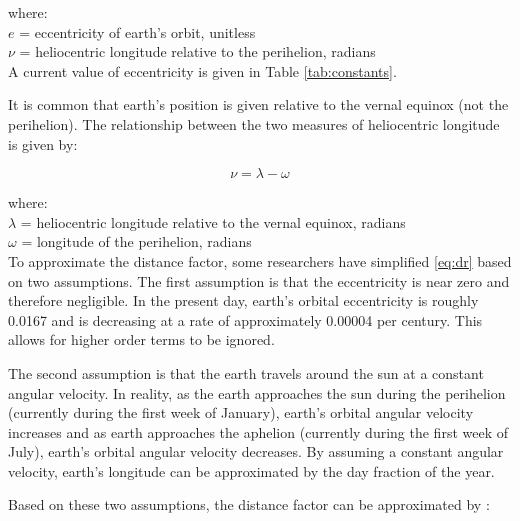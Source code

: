 \noindent where: \\
\indent $e$ = eccentricity of earth's orbit, unitless \\
\indent $\nu$ = heliocentric longitude relative to the perihelion, radians \\

\noindent A current value of eccentricity is given in Table \ref{tab:constants}.

It is common that earth's position is given relative to the vernal equinox (not the perihelion). 
The relationship between the two measures of heliocentric longitude is given by:

\begin{equation}
\label{eq:nu}
    \nu = \lambda - \omega
\end{equation}

\noindent where: \\
\indent $\lambda$ = heliocentric longitude relative to the vernal equinox, radians \\
\indent $\omega$ = longitude of the perihelion, radians\\

To approximate the distance factor, some researchers have simplified \ref{eq:dr} based on two assumptions. 
The first assumption is that the eccentricity is near zero and therefore negligible. 
In the present day, earth's orbital eccentricity is roughly 0.0167 and is decreasing at a rate of approximately 0.00004 per century\footnotemark {}. 
This allows for higher order terms to be ignored. 

The second assumption is that the earth travels around the sun at a constant angular velocity. 
In reality, as the earth approaches the sun during the perihelion (currently during the first week of January), earth's orbital angular velocity increases and as earth approaches the aphelion (currently during the first week of July), earth's orbital angular velocity decreases. 
By assuming a constant angular velocity, earth's longitude can be approximated by the day fraction of the year.

Based on these two assumptions, the distance factor can be approximated by \parencite{klein77}:

